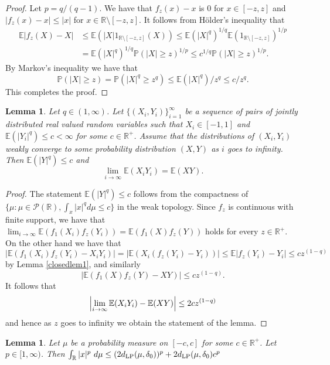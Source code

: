 \documentclass[a4wider]{amsart}
\newtheorem{lemma}[theorem]{Lemma}
\theoremstyle{definitionbreak}\newtheorem{D}[theorem]{Definition}
\theoremstyle{definitionbreak}\newtheorem*{D*}{Definition}
\begin{document}
\begin{proof} Let $p=q/(q-1)$. We have that $f_z(x)-x$ is $0$ for  $x\in[-z,z]$ and $|f_z(x)-x|\leq |x|$ for $x\in \mathbb{R}\setminus [-z,z]$. It follows from H\"older's inequality that 
\begin{align*}\mathbb{E} |f_z(X)-X|&\leq\mathbb{E}(|X|1_{\mathbb{R}\setminus[-z,z]}(X))\leq \mathbb{E}(|X|^q)^{1/q}\mathbb{E}(1_{\mathbb{R}\setminus[-z,z]})^{1/p}\\&=\mathbb{E}(|X|^q)^{1/q}\mathbb{P}(|X|\geq z)^{1/p}\leq c^{1/q}\mathbb{P}(|X|\geq z)^{1/p}.\end{align*}
By Markov's inequality we have that 
$$\mathbb{P}(|X|\geq z)=\mathbb{P}(|X|^q\geq z^q)\leq\mathbb{E}(|X|^q)/z^q\leq c/z^q.$$ This completes the proof.
 
\end{proof}

\begin{lemma}\label{closedlem2} Let $q\in (1,\infty)$.  Let $\{(X_i,Y_i)\}_{i=1}^\infty$ be a sequence of pairs of jointly distributed real valued random variables such that $X_i\in [-1,1]$ and $\mathbb{E}(|Y_i|^q)\leq c<\infty$ for some $c\in\mathbb{R}^+$. Assume that the distributions of $(X_i,Y_i)$ weakly converge to some probability distribution $(X,Y)$ as $i$ goes to infinity. Then $\mathbb{E}(|Y|^q)\leq c$ and $$\lim_{i\to\infty} \mathbb{E}(X_iY_i)=\mathbb{E}(XY).$$ 
\end{lemma}

\begin{proof}The statement $\mathbb{E}(|Y|^q)\leq c$ follows from the compactness of $\{\mu:\mu\in\mathcal{P}(\mathbb{R}),\int_x |x|^q d\mu\leq c\}$ in the weak topology. 
Since $f_z$ is continuous with finite support, we have that $\lim_{i\to\infty}\mathbb{E}(f_1(X_i)f_z(Y_i))=\mathbb{E}(f_1(X)f_z(Y))$ holds for every $z\in\mathbb{R}^+$. On the other hand we have that
$$|\mathbb{E}(f_1(X_i)f_z(Y_i)-X_iY_i)|=|\mathbb{E}(X_i(f_z(Y_i)-Y_i))|\leq \mathbb{E}|f_z(Y_i)-Y_i|\leq cz^{(1-q)}$$ 
by Lemma \ref{closedlem1}, and similarly
$$|\mathbb{E}(f_1(X)f_z(Y)-XY)|\leq cz^{(1-q)}.$$
It follows that
$$\Bigl|\lim_{i\to\infty} \mathbb{E}(X_iY_i)-\mathbb{E}(XY)\Bigr|\leq 2cz^{(1-q)}$$ and hence as $z$ goes to infinity we obtain the statement of the lemma.
\end{proof}

\begin{lemma}\label{applem1} Let $\mu$ be a probability measure on $[-c,c]$ for some $c\in\mathbb{R}^+$. Let $p\in [1,\infty)$. Then $\int_{\mathbb{R}} |x|^p~d\mu\leq (2d_{\rm LP}(\mu,\delta_{0}))^p+2d_{\rm LP}(\mu,\delta_{0})c^p$
\end{lemma}
\end{document}
